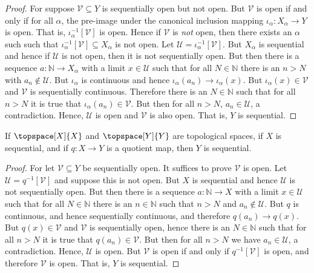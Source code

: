 \documentclass{article}                                                        %
\begin{document}
    \begin{proof}
        For suppose $\mathcal{V}\subseteq{Y}$ is sequentially open but not open.
        But $\mathcal{V}$ is open if and only if for all $\alpha$, the pre-image
        under the canonical inclusion mapping
        $\iota_{\alpha}:X_{\alpha}\rightarrow{Y}$ is open. That is,
        $\iota_{\alpha}^{\minus{1}}[\mathcal{V}]$ is open. Hence if
        $\mathcal{V}$ is \textit{not} open, then there exists an $\alpha$ such
        such that $\iota_{\alpha}^{\minus{1}}[\mathcal{V}]\subseteq{X}_{\alpha}$
        is not open. Let $\mathcal{U}=\iota_{\alpha}^{\minus{1}}[\mathcal{V}]$.
        But $X_{\alpha}$ is sequential and hence if $\mathcal{U}$ is not open,
        then it is not sequentially open. But then there is a sequence
        $a:\mathbb{N}\rightarrow{X}_{\alpha}$ with a limit $x\in\mathcal{U}$
        such that for all $N\in\mathbb{N}$ there is an $n>N$ with
        $a_{n}\notin\mathcal{U}$. But $\iota_{\alpha}$ is continuous and hence
        $\iota_{\alpha}(a_{n})\rightarrow\iota_{\alpha}(x)$. But
        $\iota_{\alpha}(x)\in\mathcal{V}$ and $\mathcal{V}$ is sequentially
        continuous. Therefore there is an $N\in\mathbb{N}$ such that for all
        $n>N$ it is true that $\iota_{\alpha}(a_{n})\in\mathcal{V}$. But then
        for all $n>N$, $a_{n}\in\mathcal{U}$, a contradiction. Hence,
        $\mathcal{U}$ is open and $\mathcal{V}$ is also open. That is, $Y$ is
        sequential.
    \end{proof}
    \begin{theorem}
        If $\topspace[X]{X}$ and $\topspace[Y]{Y}$ are topological spaces, if
        $X$ is sequential, and if $q:X\rightarrow{Y}$ is a quotient map, then
        $Y$ is sequential.
    \end{theorem}
    \begin{proof}
        For let $\mathcal{V}\subseteq{Y}$ be sequentially open. It suffices to
        prove $\mathcal{V}$ is open. Let
        $\mathcal{U}=q^{\minus{1}}[\mathcal{V}]$ and suppose this is not open.
        But $X$ is sequential and hence $\mathcal{U}$ is not sequentially open.
        But then there is a sequence $a:\mathbb{N}\rightarrow{X}$ with a limit
        $x\in\mathcal{U}$ such that for all $N\in\mathbb{N}$ there is an
        $n\in\mathbb{N}$ such that $n>N$ and $a_{n}\notin\mathcal{U}$. But $q$
        is continuous, and hence sequentially continuous, and therefore
        $q(a_{n})\rightarrow{q}(x)$. But $q(x)\in\mathcal{V}$ and $\mathcal{V}$
        is sequentially open, hence there is an $N\in\mathbb{N}$ such that
        for all $n>N$ it is true that $q(a_{n})\in\mathcal{V}$. But then for
        all $n>N$ we have $a_{n}\in\mathcal{U}$, a contradiction. Hence,
        $\mathcal{U}$ is open. But $\mathcal{V}$ is open if and only if
        $q^{\minus{1}}[\mathcal{V}]$ is open, and therefore $\mathcal{V}$ is
        open. That is, $Y$ is sequential.
    \end{proof}
\end{document}
